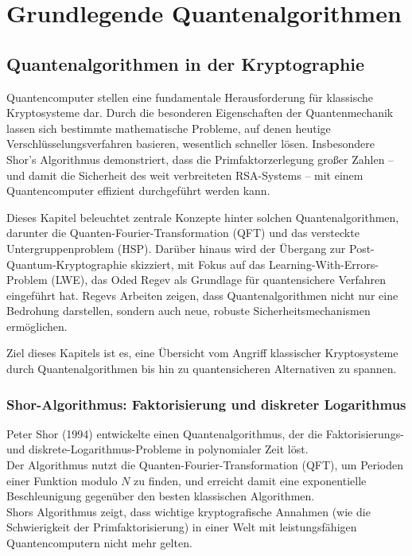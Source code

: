 \chapter{Grundlegende Quantenalgorithmen}
\label{basic_algorithms} %




\section{Quantenalgorithmen in der Kryptographie}

Quantencomputer stellen eine fundamentale Herausforderung für klassische Kryptosysteme dar. Durch die besonderen Eigenschaften der Quantenmechanik lassen sich bestimmte mathematische Probleme, auf denen heutige Verschlüsselungsverfahren basieren, wesentlich schneller lösen. Insbesondere Shor’s Algorithmus demonstriert, dass die Primfaktorzerlegung großer Zahlen – und damit die Sicherheit des weit verbreiteten RSA-Systems – mit einem Quantencomputer effizient durchgeführt werden kann.

Dieses Kapitel beleuchtet zentrale Konzepte hinter solchen Quantenalgorithmen, darunter die Quanten-Fourier-Transformation (QFT) und das versteckte Untergruppenproblem (HSP). Darüber hinaus wird der Übergang zur Post-Quantum-Kryptographie skizziert, mit  Fokus auf das Learning-With-Errors-Problem (LWE), das Oded Regev als Grundlage für quantensichere Verfahren eingeführt hat. Regevs Arbeiten zeigen, dass Quantenalgorithmen nicht nur eine Bedrohung darstellen, sondern auch neue, robuste Sicherheitsmechanismen ermöglichen.

Ziel dieses Kapitels ist es, eine Übersicht vom Angriff klassischer Kryptosysteme durch Quantenalgorithmen bis hin zu quantensicheren Alternativen zu spannen.


\subsection{Shor-Algorithmus: Faktorisierung und diskreter Logarithmus}

Peter Shor (1994) entwickelte einen Quantenalgorithmus, der die Faktorisierungs- und diskrete-Logarithmus-Probleme in polynomialer Zeit löst.\\
Der Algorithmus nutzt die Quanten-Fourier-Transformation (QFT), um Perioden einer Funktion modulo $N$ zu finden, und erreicht damit eine exponentielle Beschleunigung gegenüber den besten klassischen Algorithmen.\\
Shors Algorithmus zeigt, dass wichtige kryptografische Annahmen (wie die Schwierigkeit der Primfaktorisierung) in einer Welt mit leistungsfähigen Quantencomputern nicht mehr gelten.

